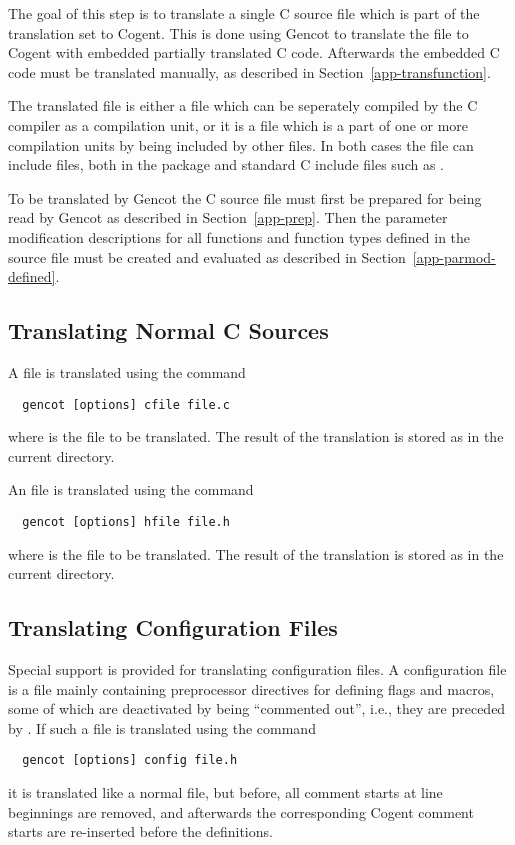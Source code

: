 The goal of this step is to translate a single C source file which is part of the translation set to Cogent.
This is done using Gencot to translate the file to Cogent with embedded partially translated C code.
Afterwards the embedded C code must be translated manually, as described in Section~\ref{app-transfunction}.

The translated file is either a  file which can be seperately compiled by the C compiler as a compilation unit,
or it is a  file which is a part of one or more compilation units by being included by other files. In both cases
the file can include  files, both in the package and standard C include files such as .

To be translated by Gencot the C source file must first be prepared for being read by Gencot as described in
Section~\ref{app-prep}. Then the parameter modification descriptions for all functions and function types defined 
in the source file must be created and evaluated as described in Section~\ref{app-parmod-defined}. 

\subsection{Translating Normal C Sources}
\label{app-transauto-normal}

A  file is translated using the command
\begin{verbatim}
  gencot [options] cfile file.c
\end{verbatim}
where  is the file to be translated. The result of the translation is stored as  
in the current directory.

An  file is translated using the command
\begin{verbatim}
  gencot [options] hfile file.h
\end{verbatim}
where  is the file to be translated. The result of the translation is 
stored as  in the current directory.

\subsection{Translating Configuration Files}
\label{app-transauto-config}

Special support is provided for translating configuration files. A configuration file is a  file mainly
containing preprocessor directives for defining flags and macros, some of which are deactivated by being ``commented
out'', i.e., they are preceded by \code{//}. If such a file is translated using the command
\begin{verbatim}
  gencot [options] config file.h
\end{verbatim}
it is translated like a normal  file, but before, all \code{//} comment starts at line beginnings are 
removed, and afterwards the corresponding Cogent comment starts \code{-\relax-} are re-inserted before the definitions.

